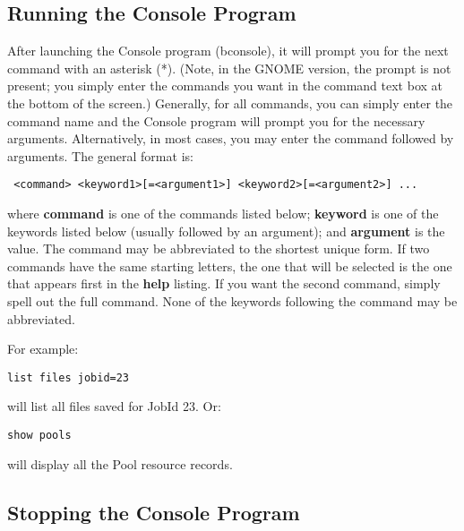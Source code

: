 \subsection*{Running the Console Program}

After launching the Console program (bconsole), it will prompt you for the
next command with an asterisk (*). (Note, in the GNOME version, the prompt is
not present; you simply enter the commands you want in the command text box at
the bottom of the screen.) Generally, for all commands, you can simply enter
the command name and the Console program will prompt you for the necessary
arguments. Alternatively, in most cases, you may enter the command followed by
arguments. The general format is: 

\footnotesize
\begin{verbatim}
 <command> <keyword1>[=<argument1>] <keyword2>[=<argument2>] ...
\end{verbatim}
\normalsize

where {\bf command} is one of the commands listed below; {\bf keyword} is one
of the keywords listed below (usually followed by an argument); and {\bf
argument} is the value. The command may be abbreviated to the shortest unique
form. If two commands have the same starting letters, the one that will be
selected is the one that appears first in the {\bf help} listing. If you want
the second command, simply spell out the full command. None of the keywords
following the command may be abbreviated. 

For example: 

\footnotesize
\begin{verbatim}
list files jobid=23
\end{verbatim}
\normalsize

will list all files saved for JobId 23. Or: 

\footnotesize
\begin{verbatim}
show pools
\end{verbatim}
\normalsize

will display all the Pool resource records. 

\subsection*{Stopping the Console Program}

